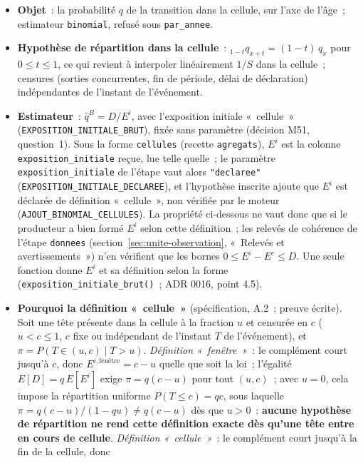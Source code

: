 \documentclass[a4paper,11pt]{article}
\newcommand{\code}[1]{\texttt{\small #1}}
\begin{document}
\begin{itemize}[leftmargin=*, itemsep=2pt]
  \item \textbf{Objet}~: la probabilité $q$ de la transition dans la cellule,
    sur l'axe de l'âge~; estimateur \code{binomial}, refusé sous
    \code{par\_annee}.
  \item \textbf{Hypothèse de répartition dans la cellule}~:
    ${}_{1-t}q_{x+t} = (1 - t)\, q_x$ pour $0 \le t \le 1$, ce qui revient à
    interpoler linéairement $1/S$ dans la cellule~; censures (sorties
    concurrentes, fin de période, délai de déclaration) indépendantes de
    l'instant de l'événement.
  \item \textbf{Estimateur}~: $\hat q^{B} = D / E^i$, avec l'exposition
    initiale «~cellule~» (\code{EXPOSITION\_INITIALE\_BRUT}), fixée sans
    paramètre (décision M51, question~1). Sous la forme \code{cellules}
    (recette \code{agregats}), $E^i$ est la colonne
    \code{exposition\_initiale} reçue, lue telle quelle~; le paramètre
    \code{exposition\_initiale} de l'étape vaut alors \code{"declaree"}
    (\code{EXPOSITION\_INITIALE\_DECLAREE}), et l'hypothèse inscrite ajoute
    que $E^i$ est déclarée de définition «~cellule~», non vérifiée par le
    moteur (\code{AJOUT\_BINOMIAL\_CELLULES}). La propriété ci-dessous
    ne vaut donc que si le producteur a bien formé $E^i$ selon cette
    définition~; les relevés de cohérence de l'étape \code{donnees}
    (section~\ref{sec:unite-observation}, «~Relevés et avertissements~»)
    n'en vérifient que les bornes $0 \le E^i - E^c \le D$. Une seule
    fonction donne $E^i$ et sa définition selon la forme
    (\code{exposition\_initiale\_brut()}~; ADR 0016, point 4.5).
  \item \textbf{Pourquoi la définition «~cellule~»} (spécification, A.2~;
    preuve écrite). Soit une tête présente dans la cellule à la fraction
    $u$ et censurée en $c$ ($u < c \le 1$, $c$ fixe ou indépendant de
    l'instant $T$ de l'événement), et $\pi = P(T \in (u, c) \mid T > u)$.
    \emph{Définition «~fenêtre~»}~: le complément court jusqu'à $c$, donc
    $E^{i,\text{fenêtre}} = c - u$ quelle que soit la loi~; l'égalité
    $E[D] = q\,E[E^i]$ exige $\pi = q(c - u)$ pour tout $(u, c)$~; avec
    $u = 0$, cela impose la répartition uniforme $P(T \le c) = qc$, sous
    laquelle $\pi = q(c - u)/(1 - qu) \ne q(c - u)$ dès que $u > 0$~:
    \textbf{aucune hypothèse de répartition ne rend cette définition exacte
    dès qu'une tête entre en cours de cellule}. \emph{Définition
    «~cellule~»}~: le complément court jusqu'à la fin de la cellule, donc

\end{itemize}
\end{document}
